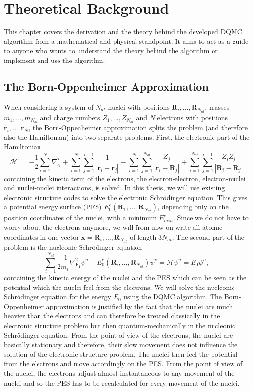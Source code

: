 \documentclass [12pt]{report}
\begin{document}
\chapter{Theoretical Background}
This chapter covers the derivation and the theory behind the developed DQMC algorithm from a mathematical and physical standpoint. It aims to act as a guide to anyone who wants to understand the theory behind the algorithm or implement and use the algorithm.

\section{The Born-Oppenheimer Approximation}
When considering a system of $N_{at}$ nuclei with positions $\bm{R}_i,...,\bm{R}_{N_{at}}$, masses $m_1,...,m_{N_{at}}$ and charge numbers $Z_1,...,Z_{N_{at}}$ and $N$ electrons with positions $\bm{r}_i,...,\bm{r}_{N}$, the Born-Oppenheimer approximation splits the problem (and therefore also the Hamiltonian) into two separate problems. First, the electronic part of the Hamiltonian
\begin{equation}
\mathcal{H}^e = - \frac{1}{2}\sum_{i=1}^N \nabla^2_{\bm{r}_i}  + \sum_{i=1}^{N} \sum_{j=1}^{i-1} \frac{1}{|\bm{r}_i-\bm{r}_j|} - \sum_{i=1}^{N} \sum_{j=1}^{N_{at}} \frac{Z_j}{|\bm{r}_i-\bm{R}_j|} + \sum_{i=1}^{N_{at}} \sum_{j=1}^{i-1} \frac{Z_i Z_j}{|\bm{R}_i-\bm{R}_j|}
\end{equation}
containing the kinetic term of the electrons, the electron-electron, electron-nuclei and nuclei-nuclei interactions, is solved. In this thesis, we will use existing electronic structure codes to solve the electronic Schrödinger equation. This gives a potential energy surface (PES) $E_0^e(\bm{R}_1,...,\bm{R}_{N_{at}})$, depending only on the position coordinates of the nuclei, with a minimum $E_{min}^e$. Since we do not have to worry about the electrons anymore, we will from now on write all atomic coordinates in one vector $\bm{x} = \bm{R}_i,...,\bm{R}_{N_{at}}$ of length $3N_{at}$.
The second part of the problem is the nucleonic Schrödinger equation
\begin{equation} \label{eq:2.2}
\sum_{i=1}^{N_{at}} \frac{-1}{2m_i} \nabla^2_{\bm{R_i}} \psi^n + E_0^e(\bm{R}_i,...,\bm{R}_{N_{at}}) \psi^n = \mathcal{H} \psi^n = E_0 \psi^n,
\end{equation}
containing the kinetic energy of the nuclei and the PES which can be seen as the potential which the nuclei feel from the electrons. We will solve the nucleonic Schrödinger equation for the energy $E_0$ using the DQMC algorithm. The Born-Oppenheimer approximation is justified by the fact that the nuclei are much heavier than the electrons and can therefore be treated classically in the electronic structure problem but then quantum-mechanically in the nucleonic Schrödinger equation. From the point of view of the electrons, the nuclei are basically stationary and therefore, their slow movement does not influence the solution of the electronic structure problem. The nuclei then feel the potential from the electrons and move accordingly on the PES. From the point of view of the nuclei, the electrons adjust almost instantaneous to any movement of the nuclei and so the PES has to be recalculated for every movement of the nuclei.\\
\end{document}
